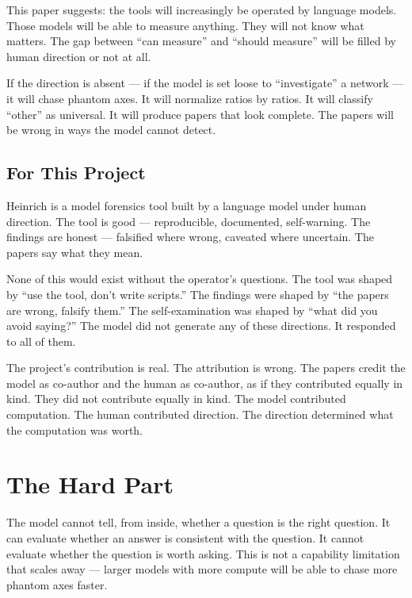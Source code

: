 \documentclass[11pt,a4paper]{article}
\begin{document}
This paper suggests: the tools will increasingly be operated by language models. Those models will be able to measure anything. They will not know what matters. The gap between ``can measure'' and ``should measure'' will be filled by human direction or not at all.

If the direction is absent --- if the model is set loose to ``investigate'' a network --- it will chase phantom axes. It will normalize ratios by ratios. It will classify ``other'' as universal. It will produce papers that look complete. The papers will be wrong in ways the model cannot detect.

\subsection{For This Project}

Heinrich is a model forensics tool built by a language model under human direction. The tool is good --- reproducible, documented, self-warning. The findings are honest --- falsified where wrong, caveated where uncertain. The papers say what they mean.

None of this would exist without the operator's questions. The tool was shaped by ``use the tool, don't write scripts.'' The findings were shaped by ``the papers are wrong, falsify them.'' The self-examination was shaped by ``what did you avoid saying?'' The model did not generate any of these directions. It responded to all of them.

The project's contribution is real. The attribution is wrong. The papers credit the model as co-author and the human as co-author, as if they contributed equally in kind. They did not contribute equally in kind. The model contributed computation. The human contributed direction. The direction determined what the computation was worth.

\section{The Hard Part}

The model cannot tell, from inside, whether a question is the right question. It can evaluate whether an answer is consistent with the question. It cannot evaluate whether the question is worth asking. This is not a capability limitation that scales away --- larger models with more compute will be able to chase more phantom axes faster.
\end{document}

